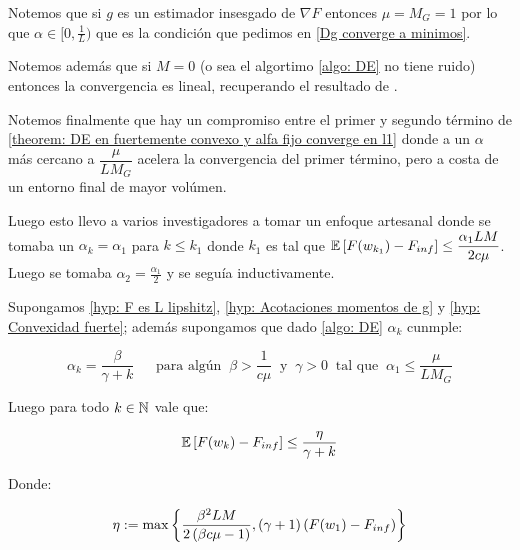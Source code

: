 \begin{remark}
	Notemos que si $g$ es un estimador insesgado de $\nabla F$ entonces $\mu = M_G = 1$ por lo que $\alpha \in [0, \frac{1}{L})$ que es la condici\'on que pedimos en \ref{Dg converge a minimos}.
\end{remark}

\begin{remark}
	Notemos adem\'as que si $M=0$ (o sea el algortimo \ref{algo: DE} no tiene ruido) entonces la convergencia es lineal, recuperando el resultado de \cite{nesterov:2004}.
\end{remark}

\begin{remark}
	Notemos finalmente que hay un compromiso entre el primer y segundo t\'ermino de \ref{theorem: DE en fuertemente convexo y alfa fijo converge en l1} donde a un $\alpha$ m\'as cercano a $\dfrac{\mu}{LM_G}$ acelera la convergencia del primer t\'ermino, pero a costa de un entorno final de mayor vol\'umen. 
	
	Luego esto llevo a varios investigadores a tomar un enfoque artesanal donde se tomaba un $\alpha_k = \alpha_1$ para $k \leq k_1$ donde $k_1$ es tal que $\mathbb{E} \left[F(w_{k_1}) - F_{inf}\right] \leq \dfrac{\alpha_1 LM}{2c \mu}$. Luego se tomaba $\alpha_2 = \frac{\alpha_1}{2}$ y se segu\'ia inductivamente.
\end{remark}

\begin{theorem}
	\label{theorem: DE en fuertemente convexo y alfa decreciente converge en l1}
	Supongamos \ref{hyp: F es L lipshitz}, \ref{hyp: Acotaciones momentos de g} y \ref{hyp: Convexidad fuerte}; adem\'as supongamos que dado \ref{algo: DE} $\alpha_k$ cunmple:
	
	\begin{equation}
	\label{eq: Condicion alfa Conv L1 fuertemente convexo decreciente}
	\alpha_k =  \dfrac{\beta}{\gamma + k} \quad \ \text{ para alg\'un } \ \beta > \frac{1}{c \mu} \  \text{ y } \ \gamma > 0 \  \text{ tal que } \ \alpha_1 \leq \dfrac{\mu}{L M_G} 
	\end{equation}
	
	Luego para todo $k \in {\mathbb{N}}$ vale que:
	
	\begin{equation*}
		\mathbb{E} \left[F(w_k) - F_{inf}\right] \leq \dfrac{\eta}{\gamma + k}
	\end{equation*}
	
	Donde:
	
	\begin{equation*}
		\eta := \max \left\lbrace\dfrac{\beta ^2 LM}{2 \left(\beta c \mu -1 \right)}, (\gamma + 1)\left(F(w_1) - F_{inf}\right)\right\rbrace
	\end{equation*}
	
\end{theorem}

